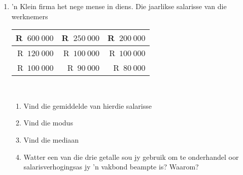 \begin{eocexercises}{}
\begin{enumerate}[itemsep=6pt, label=\textbf{\arabic*}.]
  \item ’n Klein firma het nege mense in diens. Die jaarlikse salarisse van die werknemers
\\
    \begin{center}
      \begin{tabular}{|r|r|r|} \hline
        R~$600~000$ & R~$250~000$ & R~$200~000$ \\\hline
        R~$120~000$ & R~$100~000$ & R~$100~000$ \\\hline
        R~$100~000$ &  R~$90~000$ &  R~$80~000$ \\\hline
      \end{tabular}
    \end{center}
\vspace {8pt}\\
    \begin{enumerate}[noitemsep, label=\textbf{(\alph*)} ]
    \item Vind die gemiddelde van hierdie salarisse
    \item Vind die modus
    \item Vind die mediaan
    \item Watter een van die drie getalle sou jy gebruik om te onderhandel oor salarisverhogingsas jy ’n vakbond beampte is? Waarom?
    \end{enumerate}

  \end{enumerate}
\end{eocexercises}
